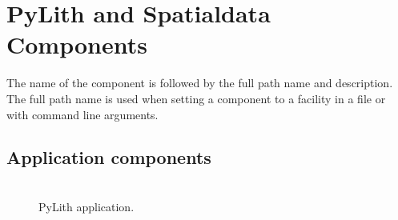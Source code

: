 \chapter{PyLith and Spatialdata Components}
\label{cha:components}

The name of the component is followed by the full path name and description.
The full path name is used when setting a component to a facility
in a  file or with command line arguments.


\section{Application components}
\begin{description}
\item [] \\
PyLith application.
\end{description}

